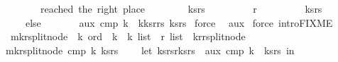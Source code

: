 \begin{isabellebody}
\ \ \ \ \ \ {\isacharparenleft}{\isacharasterisk}\ reached\ the\ right\ place\ {\isacharasterisk}{\isacharparenright}\isanewline
\ \ \ \ \ \ {\isacharparenleft}\ {\isacharparenleft}ks{}{\isacharcomma}rs{}{\isacharparenright}{\isacharcomma}\ \isanewline
\ \ \ \ \ \ \ \ r{\isacharcomma}\ \isanewline
\ \ \ \ \ \ \ \ {\isacharparenleft}ks{\isacharcomma}rs{\isacharprime}{\isacharparenright}{\isacharparenright}\isanewline
\ \ \ \ else\ \isanewline
\ \ \ \ \ \ aux{\isacharprime}\ cmp\ k{}\ \ {\isacharparenleft}k{\isacharhash}ks{}{\isacharcomma}r{\isacharhash}rs{}{\isacharparenright}\ {\isacharparenleft}ks{\isacharprime}{\isacharcomma}rs{\isacharprime}{\isacharparenright}{\isacharparenright}\isanewline
{\isacharparenright}{\isachardoublequoteclose}\isanewline
%
\isadelimproof
%
\endisadelimproof
%
\isatagproof
{}\isamarkupfalse%
\ {\isacharparenleft}force{\isacharparenright}{\isacharplus}\ \isamarkupfalse%
%
\endisatagproof
{\isafoldproof}%
%
\isadelimproof
\isanewline
%
\endisadelimproof
{}\isamarkupfalse%
\ aux{\isacharprime}\isanewline
%
\isadelimproof
%
\endisadelimproof
%
\isatagproof
{}\isamarkupfalse%
\ {\isacharparenleft}force\ intro{\isacharcolon}FIXME{\isacharparenright}%
\endisatagproof
{\isafoldproof}%
%
\isadelimproof
\isanewline
%
\endisadelimproof
\isanewline
\isanewline
{}\isamarkupfalse%
\ mk{\isacharunderscore}rsplit{\isacharunderscore}node\ {\isacharcolon}{\isacharcolon}\ {\isachardoublequoteopen}{\isacharprime}k\ ord\ {\isasymRightarrow}\ {\isacharprime}k\ {\isasymRightarrow}\ {\isacharparenleft}{\isacharprime}k\ list\ {\isacharasterisk}\ {\isacharprime}r\ list{\isacharparenright}\ {\isasymRightarrow}\ {\isacharparenleft}{\isacharprime}k{\isacharcomma}{\isacharprime}r{\isacharparenright}rsplit{\isacharunderscore}node{\isachardoublequoteclose}\ \isanewline
{\isachardoublequoteopen}mk{\isacharunderscore}rsplit{\isacharunderscore}node\ cmp\ k\ ks{\isacharunderscore}rs\ {\isacharequal}\ {\isacharparenleft}\isanewline
\ \ let\ {\isacharparenleft}{\isacharparenleft}ks{}{\isacharcomma}rs{}{\isacharparenright}{\isacharcomma}r{\isacharcomma}{\isacharparenleft}ks{}{\isacharcomma}rs{}{\isacharparenright}{\isacharparenright}\ {\isacharequal}\ aux{\isacharprime}\ cmp\ k\ {\isacharparenleft}{\isacharbrackleft}{\isacharbrackright}{\isacharcomma}{\isacharbrackleft}{\isacharbrackright}{\isacharparenright}\ ks{\isacharunderscore}rs\ in\isanewline
\ \ {\isasymlparr}\isanewline

\end{isabellebody}
